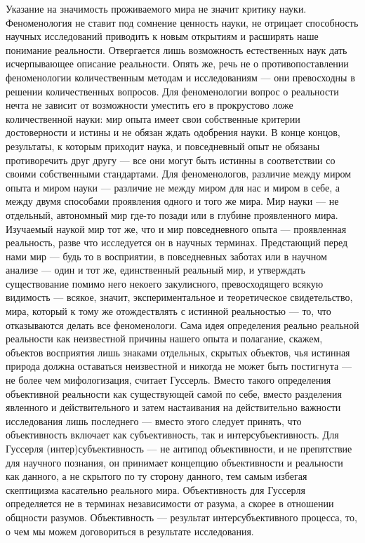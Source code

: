 \documentclass[11pt]{book}
\begin{document}
Указание на значимость проживаемого мира не значит критику науки. Феноменология не ставит под сомнение ценность науки, не отрицает способность научных исследований приводить к новым открытиям и расширять наше понимание реальности. Отвергается лишь возможность естественных наук дать исчерпывающее описание реальности. Опять же, речь не о противопоставлении феноменологии количественным методам и исследованиям --- они превосходны в решении количественных вопросов. Для феноменологии вопрос о реальности нечта не зависит от возможности уместить его в прокрустово ложе количественной науки: мир опыта имеет свои собственные критерии достоверности и истины и не обязан ждать одобрения науки. В конце концов, результаты, к которым приходит наука, и повседневный опыт не обязаны противоречить друг другу --- все они могут быть истинны в соответствии со своими собственными стандартами. Для феноменологов, различие между миром опыта и миром науки --- различие не между миром для нас и миром в себе, а между двумя способами проявления одного и того же мира. Мир науки --- не отдельный, автономный мир где-то позади или в глубине проявленного мира. Изучаемый наукой мир тот же, что и мир повседневного опыта --- проявленная реальность, разве что исследуется он в научных терминах. Предстающий перед нами мир --- будь то в восприятии, в повседневных заботах или в научном анализе --- один и тот же, единственный реальный мир, и утверждать существование помимо него некоего закулисного, превосходящего всякую видимость --- всякое, значит, экспериментальное и теоретическое свидетельство, мира, который к тому же отождествлять с истинной реальностью --- то, что отказываются делать все феноменологи. Сама идея определения реально реальной реальности как неизвестной причины нашего опыта и полагание, скажем, объектов восприятия лишь знаками отдельных, скрытых объектов, чья истинная природа должна оставаться неизвестной и никогда не может быть постигнута --- не более чем мифологизация, считает Гуссерль. Вместо такого определения объективной реальности как существующей самой по себе, вместо разделения явленного и действительного и затем настаивания на действительно важности исследования лишь последнего --- вместо этого следует принять, что объективность включает как субъективность, так и интерсубъективность. Для Гуссерля (интер)субъективность --- не антипод объективности, и не препятствие для научного познания, он принимает концепцию объективности и реальности как данного, а не скрытого по ту сторону данного, тем самым избегая скептицизма касательно реального мира. Объективность для Гуссерля определяется не в терминах независимости от разума, а скорее в отношении общности разумов. Объективность --- результат интерсубъективного процесса, то, о чем мы можем договориться в результате исследования.
\end{document}

